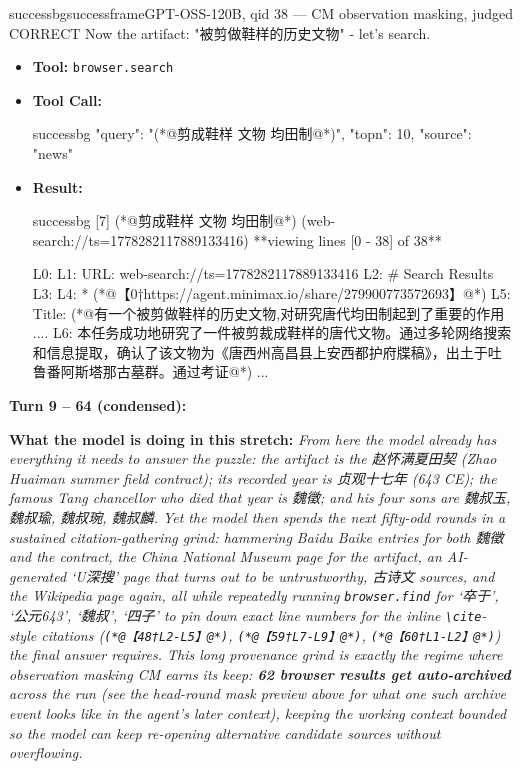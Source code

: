 \begin{casebox}{successbg}{successframe}{GPT-OSS-120B, qid 38 --- CM observation masking, judged CORRECT}
Now the artifact: "被剪做鞋样的历史文物" - let's search.

\vspace{0.3em}
\begin{itemize}[nosep, leftmargin=*, label={}]
    \item \textbf{Tool:} \texttt{browser.search}
    \item \textbf{Tool Call:}
    \vspace{-0.5em}
    \begin{toolcall}{successbg}
{"query": "(*@剪成鞋样 文物 均田制@*)", "topn": 10, "source": "news"}
    \end{toolcall}
    \vspace{-0.5em}
    \item \textbf{Result:}
    \vspace{-0.5em}
    \begin{casecode}{successbg}
[7] (*@剪成鞋样 文物 均田制@*) (web-search://ts=1778282117889133416)
**viewing lines [0 - 38] of 38**

L0: 
L1: URL: web-search://ts=1778282117889133416
L2: # Search Results
L3: 
L4:   * (*@【0†https://agent.minimax.io/share/279900773572693】@*)
L5:  Title: (*@有一个被剪做鞋样的历史文物,对研究唐代均田制起到了重要的作用 .... 
L6: 本任务成功地研究了一件被剪裁成鞋样的唐代文物。通过多轮网络搜索和信息提取，确认了该文物为《唐西州高昌县上安西都护府牒稿》，出土于吐鲁番阿斯塔那古墓群。通过考证@*) 
...
    \end{casecode}
\end{itemize}
\vspace{1em}

\textbf{Turn 9 -- 64 (condensed):}

\textbf{What the model is doing in this stretch:} \emph{From here the model already has everything it needs to answer the puzzle: the artifact is the {赵怀满夏田契} (Zhao Huaiman summer field contract); its recorded year is {贞观十七年} (643 CE); the famous Tang chancellor who died that year is {魏徵}; and his four sons are {魏叔玉}, {魏叔瑜}, {魏叔琬}, {魏叔麟}. Yet the model then spends the next fifty-odd rounds in a sustained citation-gathering grind: hammering Baidu Baike entries for both {魏徵} and the contract, the China National Museum page for the artifact, an AI-generated `U{深搜}' page that turns out to be untrustworthy, {古诗文} sources, and the Wikipedia page again, all while repeatedly running \texttt{browser.find} for `{卒于}', `{公元643}', `{魏叔}', `{四子}' to pin down exact line numbers for the inline \texttt{\textbackslash{}cite}-style citations (\texttt{(*@【48†L2-L5】@*)}, \texttt{(*@【59†L7-L9】@*)}, \texttt{(*@【60†L1-L2】@*)}) the final answer requires. This long provenance grind is exactly the regime where observation masking CM earns its keep: \textbf{62 browser results get auto-archived} across the run (see the head-round mask preview above for what one such archive event looks like in the agent's later context), keeping the working context bounded so the model can keep re-opening alternative candidate sources without overflowing.}


\end{casebox}
